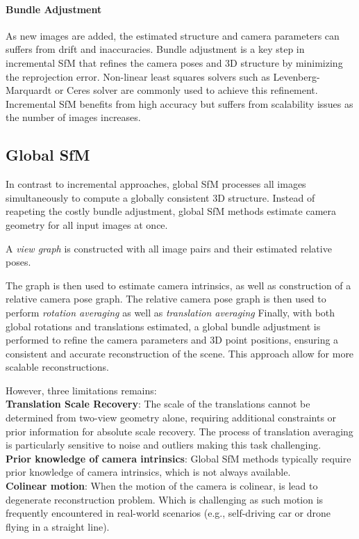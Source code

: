 \paragraph{Bundle Adjustment}
As new images are added, the estimated structure and camera parameters can suffers from drift and inaccuracies.
Bundle adjustment is a key step in incremental SfM that refines the camera poses and 3D structure by minimizing the reprojection error.
Non-linear least squares solvers such as Levenberg-Marquardt or Ceres solver are commonly used to achieve this refinement. 
Incremental SfM benefits from high accuracy but suffers from scalability issues as the number of images increases.

\subsection{Global SfM}
In contrast to incremental approaches, global SfM processes all images simultaneously to compute a globally consistent 3D structure.
Instead of reapeting the costly bundle adjustment, global SfM methods estimate camera geometry for all input images at once.

A \emph{view graph} is constructed with all image pairs and their estimated relative poses.

The graph is then used to estimate camera intrinsics, as well as construction of a relative camera pose graph.
The relative camera pose graph is then used to perform \emph{rotation averaging} as well as \emph{translation averaging} \cite{Chatterjee2013, theia-manual, moulon2016openmvg}
Finally, with both global rotations and translations estimated, a global bundle adjustment is performed to refine the camera parameters and 3D point positions, ensuring a consistent and accurate reconstruction of the scene.
This approach allow for more scalable reconstructions.

However, three limitations remains: \\
\textbf{Translation Scale Recovery}: The scale of the translations cannot be determined from two-view geometry alone, requiring additional constraints or prior information for absolute scale recovery.
The process of translation averaging is particularly sensitive to noise and outliers making this task challenging. \\
\textbf{Prior knowledge of camera intrinsics}: Global SfM methods typically require prior knowledge of camera intrinsics, which is not always available. \\
\textbf{Colinear motion}: When the motion of the camera is colinear, is lead to degenerate reconstruction problem. Which is challenging as such motion is frequently encountered in real-world scenarios (e.g., self-driving car or drone flying in a straight line).

